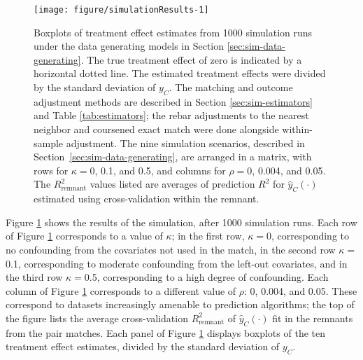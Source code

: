 \documentclass[12pt]{article}\usepackage[]{graphicx}\usepackage[]{color}
\makeatletter
\def\maxwidth{ %
  \ifdim\Gin@nat@width>\linewidth
    \linewidth
  \else
    \Gin@nat@width
  \fi
}
\newenvironment{knitrout}{}{} %
\newcommand{\algorithm}{\hat{y}_C(\cdot)}
\makeatother
\begin{document}
\begin{figure}
\centering
\begin{knitrout}
\color{fgcolor}
\texttt{[image: figure/simulationResults-1]} 

\end{knitrout}
\caption{Boxplots of treatment effect estimates from 1000
  simulation runs under the data generating models in Section
  \ref{sec:sim-data-generating}. The true treatment effect of zero is indicated by a
  horizontal dotted line. The estimated treatment effects were
  divided by the standard deviation of $y_C$. %
  The matching and outcome adjustment methods are described in Section
  \ref{sec:sim-estimators} and Table \ref{tab:estimators}; the rebar
  adjustments to the nearest neighbor and coursened exact match were
  done alongside within-sample adjustment.%
The nine simulation scenarios, described in
Section~\ref{sec:sim-data-generating}, are arranged in a matrix, with
rows for $\kappa=$0, 0.1, and 0.5,
and columns for $\rho=$0, 0.004, and
0.05. %
The $R^2_{\text{remnant}}$ values listed are averages of prediction $R^2$ for $\algorithm$ estimated using cross-validation within the remnant.}
\label{fig:simulationResults}
\end{figure}

Figure \ref{fig:simulationResults} shows the results of the simulation, after 1000 simulation runs.
Each row of Figure \ref{fig:simulationResults} corresponds to a value of $\kappa$; in the first row, $\kappa=$0, corresponding to no confounding from the covariates not used in the match, in the second row $\kappa=$0.1, corresponding to moderate confounding from the left-out covariates, and in the third row $\kappa=$0.5, corresponding to a high degree of confounding.
Each column of Figure \ref{fig:simulationResults} corresponds to a different value of $\rho$: 0, 0.004, and 0.05.
These correspond to datasets increasingly amenable to prediction
algorithms; the top of the figure lists the average cross-validation
$R^2_{\text{remnant}}$ of $\algorithm$ fit in the remnants from the
pair matches.
Each panel of Figure \ref{fig:simulationResults} displays boxplots of the
ten treatment effect estimates, divided by the standard deviation of
$y_C$.
\end{document}
